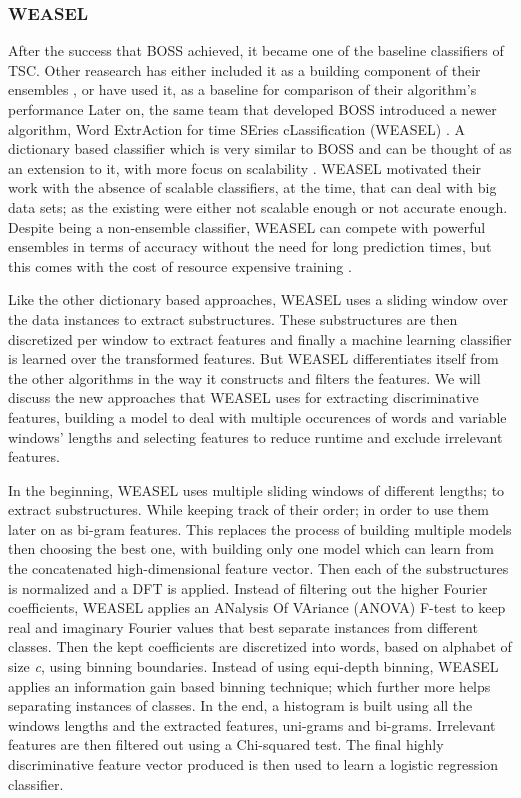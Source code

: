 \subsubsection{WEASEL}
\label{SubsubsectionWEASEL}
After the success that BOSS achieved, it became one of the baseline classifiers of TSC.
Other reasearch has either included it as a building component of their ensembles \cite{lines2018time, bagnall2015time},
or have used it, as a baseline for comparison of their algorithm's performance \cite{fawaz2020inceptiontime,shifaz2020ts,lucas2019proximity}
Later on, the same team that developed BOSS introduced a newer algorithm, Word ExtrAction for time SEries cLassification (WEASEL) \cite{schafer2017fast}.
A dictionary based classifier which is very similar to BOSS and can be thought of as an extension to it, with more focus on scalability \cite{middlehurst2019scalable}.
WEASEL motivated their work with the absence of scalable classifiers, at the time, that can deal with big data sets; as the existing were either not scalable enough
or not accurate enough. Despite being a non-ensemble classifier, WEASEL can compete with powerful ensembles in terms of accuracy without the need for
long prediction times, but this comes with the cost of resource expensive training \cite{middlehurst2019scalable}.

Like the other dictionary based approaches, WEASEL uses a sliding window over the data instances to extract substructures.
These substructures are then discretized per window to extract features and finally a machine learning classifier is learned over the transformed features.
But WEASEL differentiates itself from the other algorithms in the way it constructs and filters the features.
We will discuss the new approaches that WEASEL uses for extracting discriminative features, building a model to deal with multiple occurences of words and variable windows' lengths
and selecting features to reduce runtime and exclude irrelevant features.

In the beginning, WEASEL uses multiple sliding windows of different lengths; to extract substructures.
While keeping track of their order; in order to use them later on as bi-gram features.
This replaces the process of building multiple models then choosing the best one, with building only one model which can learn from the concatenated high-dimensional feature vector.
Then each of the substructures is normalized and a DFT is applied.
Instead of filtering out the higher Fourier coefficients, WEASEL applies an ANalysis Of VAriance (ANOVA) F-test to keep real and imaginary Fourier values that best separate instances from different classes.
Then the kept coefficients are discretized into words, based on alphabet of size \emph{c}, using binning boundaries. Instead of using equi-depth binning, WEASEL applies an information gain based
binning technique; which further more helps separating instances of classes.
In the end, a histogram is built using all the windows lengths and the extracted features, uni-grams and bi-grams.
Irrelevant features are then filtered out using a Chi-squared test. The final highly discriminative feature vector produced is then used to learn a logistic regression classifier.

